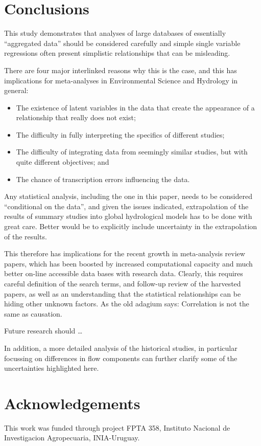 \documentclass[]{elsarticle} %
\providecommand{\tightlist}{%
  \setlength{\itemsep}{0pt}\setlength{\parskip}{0pt}}
\begin{document}
\hypertarget{conclusions}{%
\section{Conclusions}\label{conclusions}}

This study demonstrates that analyses of large databases of essentially ``aggregated data'' should be considered carefully and simple single variable regressions often present simplistic relationships that can be misleading.

There are four major interlinked reasons why this is the case, and this has implications for meta-analyses in Environmental Science and Hydrology in general:

\begin{itemize}
\tightlist
\item
  The existence of latent variables in the data that create the appearance of a relationship that really does not exist;\\
\item
  The difficulty in fully interpreting the specifics of different studies;\\
\item
  The difficulty of integrating data from seemingly similar studies, but with quite different objectives; and\\
\item
  The chance of transcription errors influencing the data.
\end{itemize}

Any statistical analysis, including the one in this paper, needs to be considered ``conditional on the data'', and given the issues indicated, extrapolation of the results of summary studies into global hydrological models has to be done with great care. Better would be to explicitly include uncertainty in the extrapolation of the results.

This therefore has implications for the recent growth in meta-analysis review papers, which has been boosted by increased computational capacity and much better on-line accessible data bases with research data. Clearly, this requires careful definition of the search terms, and follow-up review of the harvested papers, as well as an understanding that the statistical relationships can be hiding other unknown factors. As the old adagium says: Correlation is not the same as causation.

Future research should \ldots{}

In addition, a more detailed analysis of the historical studies, in particular focussing on differences in flow components can further clarify some of the uncertainties highlighted here.

\hypertarget{acknowledgements}{%
\section{Acknowledgements}\label{acknowledgements}}

This work was funded through project FPTA 358, Instituto Nacional de Investigacion Agropecuaria, INIA-Uruguay.

\renewcommand\refname{References}

\end{document}
